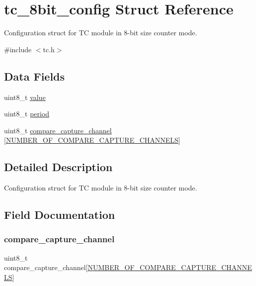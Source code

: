 \hypertarget{structtc__8bit__config}{}\section{tc\+\_\+8bit\+\_\+config Struct Reference}
\label{structtc__8bit__config}


Configuration struct for TC module in 8-\/bit size counter mode.  




{\ttfamily \#include $<$tc.\+h$>$}

\subsection*{Data Fields}
\begin{DoxyCompactItemize}
\item 
uint8\+\_\+t \mbox{\hyperlink{structtc__8bit__config_a638e4503e0ae6ce655b7ad2e17e8f0ad}{value}}
\item 
uint8\+\_\+t \mbox{\hyperlink{structtc__8bit__config_a3b3d05afca80e957f9406a1db1f5b8c2}{period}}
\item 
uint8\+\_\+t \mbox{\hyperlink{structtc__8bit__config_a42b6976522c66d7cc768133d9af442d0}{compare\+\_\+capture\+\_\+channel}} \mbox{[}\mbox{\hyperlink{group__asfdoc__sam0__tc__group_gac837f9db5df1793578c195a979c6a9d3}{N\+U\+M\+B\+E\+R\+\_\+\+O\+F\+\_\+\+C\+O\+M\+P\+A\+R\+E\+\_\+\+C\+A\+P\+T\+U\+R\+E\+\_\+\+C\+H\+A\+N\+N\+E\+LS}}\mbox{]}
\end{DoxyCompactItemize}


\subsection{Detailed Description}
Configuration struct for TC module in 8-\/bit size counter mode. 

\subsection{Field Documentation}
\mbox{\label{structtc__8bit__config_a42b6976522c66d7cc768133d9af442d0}} 
\subsubsection{\texorpdfstring{compare\_capture\_channel}{compare\_capture\_channel}}
{\footnotesize\ttfamily uint8\+\_\+t compare\+\_\+capture\+\_\+channel\mbox{[}\mbox{\hyperlink{group__asfdoc__sam0__tc__group_gac837f9db5df1793578c195a979c6a9d3}{N\+U\+M\+B\+E\+R\+\_\+\+O\+F\+\_\+\+C\+O\+M\+P\+A\+R\+E\+\_\+\+C\+A\+P\+T\+U\+R\+E\+\_\+\+C\+H\+A\+N\+N\+E\+LS}}\mbox{]}}

